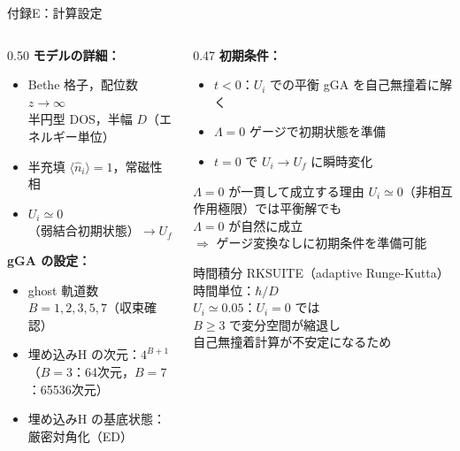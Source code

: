 \documentclass[12pt,aspectratio=169]{beamer}
\begin{document}
\begin{frame}[shrink=8]{付録E：計算設定}
  \small
  \begin{columns}[T]
    \begin{column}{0.50\textwidth}
      \textbf{モデルの詳細：}
      \begin{itemize}\itemsep1pt
        \item Bethe 格子，配位数 $z\to\infty$\\
          半円型 DOS，半幅 $D$（エネルギー単位）
        \item 半充填 $\langle\hat{n}_i\rangle=1$，常磁性相
        \item $U_i\simeq 0$（弱結合初期状態）$\to U_f$
      \end{itemize}

      \smallskip
      \textbf{gGA の設定：}
      \begin{itemize}\itemsep1pt
        \item ghost 軌道数 $B=1,2,3,5,7$（収束確認）
        \item 埋め込みH の次元：$4^{B+1}$\\
          （$B=3$：64次元，$B=7$：65536次元）
        \item 埋め込みH の基底状態：厳密対角化（ED）
      \end{itemize}
    \end{column}

    \begin{column}{0.47\textwidth}
      \textbf{初期条件：}
      \begin{itemize}\itemsep1pt
        \item $t<0$：$U_i$ での平衡 gGA を自己無撞着に解く
        \item $\Lambda=0$ ゲージで初期状態を準備
        \item $t=0$ で $U_i\to U_f$ に瞬時変化
      \end{itemize}

      \begin{block}{\footnotesize $\Lambda=0$ が一貫して成立する理由}
        \footnotesize
        $U_i\simeq 0$（非相互作用極限）では平衡解でも\\
        $\Lambda=0$ が自然に成立\\
        $\Rightarrow$ ゲージ変換なしに初期条件を準備可能
      \end{block}

      \smallskip
      \begin{block}{\footnotesize 時間積分}
        \footnotesize
        RKSUITE（adaptive Runge-Kutta）\\
        時間単位：$\hbar/D$\\
        $U_i\simeq0.05$：$U_i=0$ では\\
        $B\geq3$ で変分空間が縮退し\\
        自己無撞着計算が不安定になるため
      \end{block}


\end{column}
\end{columns}
\end{frame}
\end{document}
